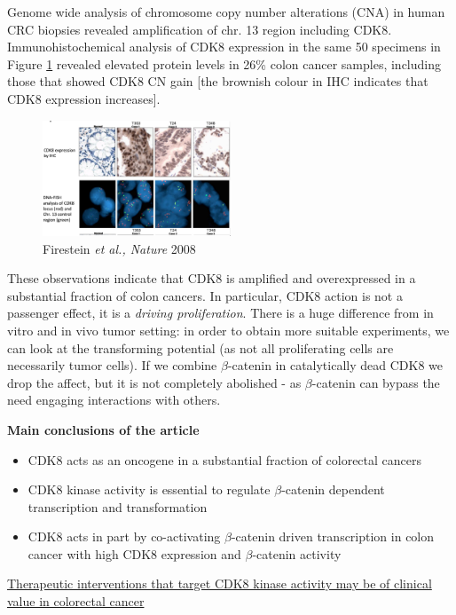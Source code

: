 Genome wide analysis of chromosome copy number alterations (CNA) in human CRC biopsies revealed amplification of chr. 13 region including CDK8. Immunohistochemical analysis of CDK8 expression in the same 50 specimens in Figure \ref{fig:histo} revealed elevated protein levels in 26\% colon cancer samples, including those that showed CDK8 CN gain {[}the brownish colour in IHC indicates that CDK8 expression increases{]}.

\begin{figure}
\centering
\includegraphics[width=0.5\textwidth]{../_resources/Screenshot_2022-10-10_at_12-23-14.png}
\caption{Firestein \emph{et al., Nature} 2008}
\label{fig:histo}
\end{figure}

These observations indicate that CDK8 is amplified and overexpressed in a substantial fraction of colon cancers. In particular, CDK8 action is not a passenger effect, it is a \emph{driving proliferation}. There is a huge difference from in vitro and in vivo tumor setting: in order to obtain more suitable experiments, we can look at the transforming potential (as not all proliferating cells are necessarily tumor cells). If we combine $\beta$-catenin in catalytically dead CDK8 we drop the affect, but it is not completely abolished - as $\beta$-catenin can bypass the need engaging interactions with others.

\textbf{Main conclusions of the article}

\begin{itemize}
\tightlist
\item
  CDK8 acts as an oncogene in a substantial fraction of colorectal cancers
\item
  CDK8 kinase activity is essential to regulate $\beta$-catenin dependent transcription and transformation
\item
  CDK8 acts in part by co-activating $\beta$-catenin driven transcription in colon cancer with high CDK8 expression and $\beta$-catenin activity
\end{itemize}

\underline{Therapeutic interventions that target CDK8 kinase activity may be of clinical value in colorectal cancer}


